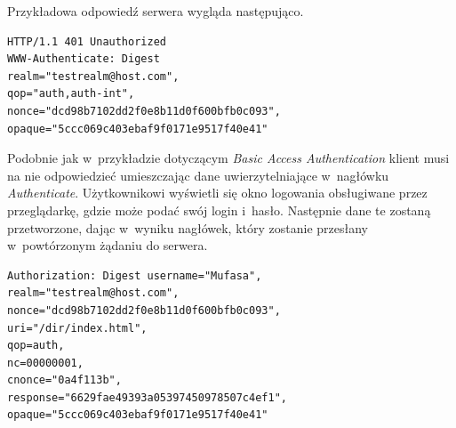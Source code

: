 \documentclass[11pt]{aghdpl}
\begin{document}
Przykładowa odpowiedź serwera wygląda następująco.
\begin{lstlisting}
HTTP/1.1 401 Unauthorized
WWW-Authenticate: Digest
realm="testrealm@host.com",
qop="auth,auth-int",
nonce="dcd98b7102dd2f0e8b11d0f600bfb0c093",
opaque="5ccc069c403ebaf9f0171e9517f40e41"
\end{lstlisting}

Podobnie jak w~przykładzie dotyczącym \emph{Basic Access Authentication} klient musi na nie odpowiedzieć umieszczając dane uwierzytelniające w~nagłówku \emph{Authenticate}. Użytkownikowi wyświetli się okno logowania obsługiwane przez przeglądarkę, gdzie może podać swój login i~hasło. Następnie dane te zostaną przetworzone, dając w~wyniku nagłówek, który zostanie przesłany w~powtórzonym żądaniu do serwera.
\begin{lstlisting}
Authorization: Digest username="Mufasa",
realm="testrealm@host.com",
nonce="dcd98b7102dd2f0e8b11d0f600bfb0c093",
uri="/dir/index.html",
qop=auth,
nc=00000001,
cnonce="0a4f113b",
response="6629fae49393a05397450978507c4ef1",
opaque="5ccc069c403ebaf9f0171e9517f40e41"
\end{lstlisting}
\end{document}
